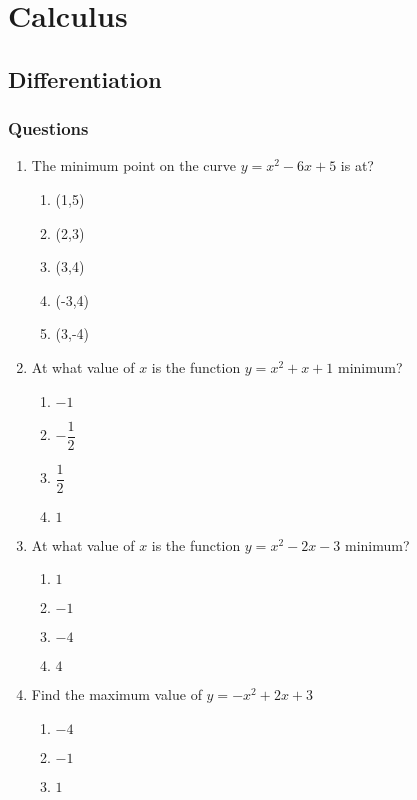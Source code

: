 \chapter{Calculus}
\section{Differentiation}
\subsection{Questions}
\begin{multicols}{2}
  \begin{enumerate}[label={\arabic*.}]
    \item The minimum point on the curve \(y = {x}^{2} - 6x + 5\) is at?
      \begin{enumerate}[label={\Alph*.}]
        \item (1,5)
        \item (2,3)
        \item (3,4)
        \item (-3,4)
        \item (3,-4)
      \end{enumerate}
    \item At what value of \(x\) is the function \(y = {x}^{2} + x + 1\) minimum?
      \begin{enumerate}[label={\Alph*.}]
        \item \(-1\)
        \item \(-\dfrac{1}{2}\)
        \item \(\dfrac{1}{2}\)
        \item \(1\)
      \end{enumerate}
    \item At what value of \(x\) is the function \(y = {x}^{2} - 2x - 3\) minimum?
      \begin{enumerate}[label={\Alph*.}]
        \item \(1\)
        \item \(-1\)
        \item \(-4\)
        \item \(4\)
      \end{enumerate}
    \item Find the maximum value of \(y = -{x}^{2} + 2x + 3\)
      \begin{enumerate}[label={\Alph*.}]
        \item \(-4\)
        \item \(-1\)
        \item \(1\)

\end{enumerate}
\end{enumerate}
\end{multicols}
